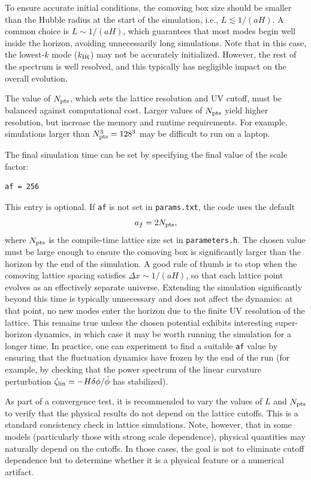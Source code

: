 \documentclass[aps, nofootinbib,superscriptaddress, preprintnumbers, longbibliography]{article}
\begin{document}
To ensure accurate initial conditions, the comoving box size should be smaller than the Hubble radius at the start of the simulation, i.e., $L \lesssim 1/(aH)$. A common choice is $L \sim 1/(aH)$, which guarantees that most modes begin well inside the horizon, avoiding unnecessarily long simulations. Note that in this case, the lowest-$k$ mode ($k_{\rm IR}$) may not be accurately initialized. However, the rest of the spectrum is well resolved, and this typically has negligible impact on the overall evolution.

The value of $N_{\rm pts}$, which sets the lattice resolution and UV cutoff, must be balanced against computational cost. Larger values of $N_{\rm pts}$ yield higher resolution, but increase the memory and runtime requirements. For example, simulations larger than $N^3_{\rm pts} = 128^3$ may be difficult to run on a laptop.

The final simulation time can be set by specifying the final value of the scale factor:
\begin{lstlisting}[language=bash,numbers=none]
af = 256
\end{lstlisting}
This entry is optional. If \texttt{af} is not set in \texttt{params.txt}, the code uses the default
\[
a_f = 2N_{\rm pts},
\]
where $N_{\rm pts}$ is the compile-time lattice size set in \texttt{parameters.h}. The chosen value must be large enough to ensure the comoving box is significantly larger than the horizon by the end of the simulation. A good rule of thumb is to stop when the comoving lattice spacing satisfies $\Delta x \sim 1/(aH)$, so that each lattice point evolves as an effectively separate universe. Extending the simulation significantly beyond this time is typically unnecessary and does not affect the dynamics: at that point, no new modes enter the horizon due to the finite UV resolution of the lattice. This remains true unless the chosen potential exhibits interesting super-horizon dynamics, in which case it may be worth running the simulation for a longer time. In practice, one can experiment to find a suitable \texttt{af} value by ensuring that the fluctuation dynamics have frozen by the end of the run (for example, by checking that the power spectrum of the linear curvature perturbation $\zeta_{\rm lin} = -H \delta\phi / \dot\phi$ has stabilized).

As part of a convergence test, it is recommended to vary the values of $L$ and $N_{\rm pts}$ to verify that the physical results do not depend on the lattice cutoffs. This is a standard consistency check in lattice simulations. Note, however, that in some models (particularly those with strong scale dependence), physical quantities may naturally depend on the cutoffs. In those cases, the goal is not to eliminate cutoff dependence but to determine whether it is a physical feature or a numerical artifact.
\end{document}
